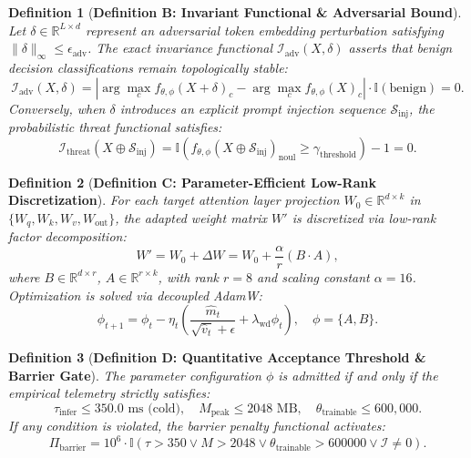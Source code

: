 \documentclass[10pt,journal,compsoc]{IEEEtran}
\newtheorem{definition}{Definition}
\theoremstyle{remark}
\begin{document}
\begin{definition}[\textbf{Definition B: Invariant Functional \& Adversarial Bound}]
Let $\delta \in \mathbb{R}^{L \times d}$ represent an adversarial token embedding perturbation satisfying $\|\delta\|_\infty \le \epsilon_{\text{adv}}$. The exact invariance functional $\mathcal{I}_{\text{adv}}(X, \delta)$ asserts that benign decision classifications remain topologically stable:
\begin{equation}
\mathcal{I}_{\text{adv}}(X, \delta) = \left| \arg\max_{c} f_{\theta, \phi}(X + \delta)_c - \arg\max_{c} f_{\theta, \phi}(X)_c \right| \cdot \mathbb{I}(\text{benign}) = 0.
\end{equation}
Conversely, when $\delta$ introduces an explicit prompt injection sequence $\mathcal{S}_{\text{inj}}$, the probabilistic threat functional satisfies:
\begin{equation}
\mathcal{I}_{\text{threat}}(X \oplus \mathcal{S}_{\text{inj}}) = \mathbb{I}\left(f_{\theta, \phi}(X \oplus \mathcal{S}_{\text{inj}})_{\text{noul}} \ge \gamma_{\text{threshold}}\right) - 1 = 0.
\end{equation}
\end{definition}

\begin{definition}[\textbf{Definition C: Parameter-Efficient Low-Rank Discretization}]
For each target attention layer projection $W_0 \in \mathbb{R}^{d \times k}$ in $\{W_q, W_k, W_v, W_{\text{out}}\}$, the adapted weight matrix $W'$ is discretized via low-rank factor decomposition:
\begin{equation}
W' = W_0 + \Delta W = W_0 + \frac{\alpha}{r} (B \cdot A),
\label{eq:lora_discretization}
\end{equation}
where $B \in \mathbb{R}^{d \times r}$, $A \in \mathbb{R}^{r \times k}$, with rank $r = 8$ and scaling constant $\alpha = 16$. Optimization is solved via decoupled AdamW:
\begin{equation}
\phi_{t+1} = \phi_t - \eta_t \left( \frac{\hat{m}_t}{\sqrt{\hat{v}_t} + \epsilon} + \lambda_{\text{wd}} \phi_t \right), \quad \phi = \{A, B\}.
\end{equation}
\end{definition}

\begin{definition}[\textbf{Definition D: Quantitative Acceptance Threshold \& Barrier Gate}]
The parameter configuration $\phi$ is admitted if and only if the empirical telemetry strictly satisfies:
\begin{equation}
\tau_{\text{infer}} \le 350.0\text{ ms (cold)}, \quad M_{\text{peak}} \le 2048\text{ MB}, \quad \theta_{\text{trainable}} \le 600,000.
\end{equation}
If any condition is violated, the barrier penalty functional activates:
\begin{equation}
\Pi_{\text{barrier}} = 10^6 \cdot \mathbb{I}\left(\tau > 350 \lor M > 2048 \lor \theta_{\text{trainable}} > 600000 \lor \mathcal{I} \neq 0\right).
\end{equation}
\end{definition}
\end{document}
